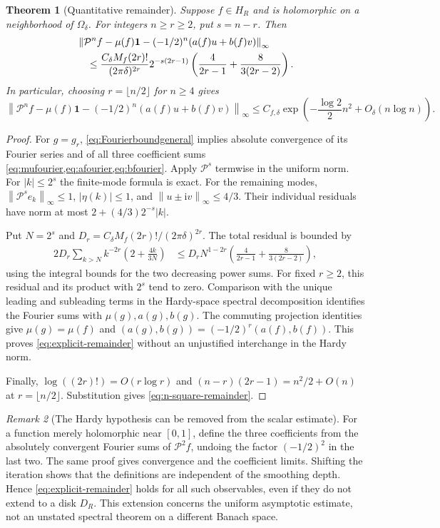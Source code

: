 \documentclass[11pt,a4paper]{article}
\newtheorem{theorem}{Theorem}[section]
\theoremstyle{definition}
\theoremstyle{remark}
\newtheorem{remark}[theorem]{Remark}
\newcommand{\ii}{\mathrm i}
\newcommand{\one}{\mathbf 1}
\newcommand{\Pop}{\mathcal P}
\newcommand{\norm}[1]{\left\|#1\right\|}
\numberwithin{equation}{section}
\begin{document}
\begin{theorem}[Quantitative remainder]
\label{thm:quantitative}
Suppose $f\in H_R$ and is holomorphic on a neighborhood of
$\Omega_\delta$. For integers $n\ge r\ge2$, put $s=n-r$. Then
\begin{align}
 &\norm{\Pop^nf-\mu(f)\one-(-1/2)^n(a(f)u+b(f)v)}_\infty\notag\\
 &\quad\le
 \frac{C_\delta M_f(2r)!}{(2\pi\delta)^{2r}}
 2^{-s(2r-1)}
 \left(\frac4{2r-1}+\frac8{3(2r-2)}\right).
 \label{eq:explicit-remainder}
\end{align}
In particular, choosing $r=\lfloor n/2\rfloor$ for $n\ge4$ gives
\begin{equation}
 \norm{\Pop^nf-\mu(f)\one-(-1/2)^n(a(f)u+b(f)v)}_\infty
 \le C_{f,\delta}
 \exp\!\left(-\frac{\log2}{2}n^2+O_\delta(n\log n)\right).
 \label{eq:n-square-remainder}
\end{equation}
\end{theorem}
\begin{proof}
For $g=g_r$, \cref{eq:Fourierboundgeneral} implies absolute convergence of
its Fourier series and of all three coefficient sums
\cref{eq:mufourier,eq:afourier,eq:bfourier}. Apply $\Pop^s$ termwise in the
uniform norm. For $|k|\le2^s$ the finite-mode formula is exact. For the
remaining modes, $\norm{\Pop^se_k}_\infty\le1$, $|\eta(k)|\le1$, and
$\norm{u\pm\ii v}_\infty\le4/3$. Their individual residuals have norm
at most $2+(4/3)2^{-s}|k|$.

Put $N=2^s$ and
$D_r=C_\delta M_f(2r)!/(2\pi\delta)^{2r}$. The total residual is bounded by
\begin{align*}
 2D_r\sum_{k>N}k^{-2r}\left(2+\frac{4k}{3N}\right)
 &\le D_rN^{1-2r}
     \left(\frac4{2r-1}+\frac8{3(2r-2)}\right),
\end{align*}
using the integral bounds for the two decreasing power sums.
For fixed $r\ge2$, this residual and its product with $2^s$ tend to zero.
Comparison with the unique leading and subleading terms in the Hardy-space
spectral decomposition identifies the Fourier sums with $\mu(g),a(g),b(g)$.
The commuting projection identities give
$\mu(g)=\mu(f)$ and $(a(g),b(g))=(-1/2)^r(a(f),b(f))$.
This proves \cref{eq:explicit-remainder} without an unjustified
interchange in the Hardy norm.

Finally, $\log((2r)!)=O(r\log r)$ and
$(n-r)(2r-1)=n^2/2+O(n)$ at $r=\lfloor n/2\rfloor$.
Substitution gives \cref{eq:n-square-remainder}.
\end{proof}

\begin{remark}[The Hardy hypothesis can be removed from the scalar estimate]
For a function merely holomorphic near $[0,1]$, define the three coefficients
from the absolutely convergent Fourier sums of $\Pop^2f$, undoing the factor
$(-1/2)^2$ in the last two. The same proof gives convergence and the
coefficient limits. Shifting the iteration shows that the definitions are
independent of the smoothing depth. Hence \cref{eq:explicit-remainder}
holds for all such observables, even if they do not extend to a disk $D_R$.
This extension concerns the uniform asymptotic estimate, not an unstated
spectral theorem on a different Banach space.
\end{remark}
\end{document}
